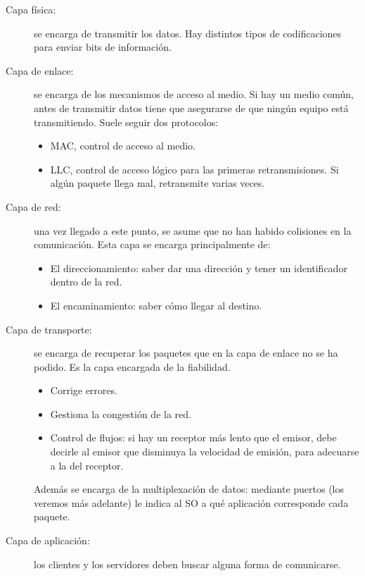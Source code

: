 \begin{description}
    \item [Capa física:] se encarga de transmitir los datos. Hay distintos tipos de codificaciones para enviar bits de información.
    \item [Capa de enlace:] se encarga de los mecanismos de acceso al medio. Si hay un medio común, antes de transmitir datos tiene que asegurarse de que ningún equipo está transmitiendo. Suele seguir dos protocolos: 
        \begin{itemize}
            \item \acrfull{MAC}, control de acceso al medio.
            \item \acrfull{LLC}, control de acceso lógico para las primeras retransmisiones. Si algún paquete llega mal, retransmite varias veces. 
        \end{itemize}
    
    \item [Capa de red:] una vez llegado a este punto, se asume que no han habido colisiones en la comunicación. Esta capa se encarga principalmente de: 
        \begin{itemize}
            \item El direccionamiento: saber dar una dirección y tener un identificador dentro de la red. 
            \item El encaminamiento: saber cómo llegar al destino. 
        \end{itemize}

    \item [Capa de transporte:] se encarga de recuperar los paquetes que en la capa de enlace no se ha podido. Es la capa encargada de la fiabilidad. 
        \begin{itemize}
            \item Corrige errores.
            \item Gestiona la congestión de la red.
            \item Control de flujos: si hay un receptor más lento que el emisor, debe decirle al emisor que disminuya la velocidad de emisión, para adecuarse a la del receptor. 
        \end{itemize}
    Además se encarga de la multiplexación de datos: mediante puertos (los veremos más adelante) le indica al SO a qué aplicación corresponde cada paquete. 
    \item [Capa de aplicación:] los clientes y los servidores deben buscar alguna forma de comunicarse. 
\end{description}

